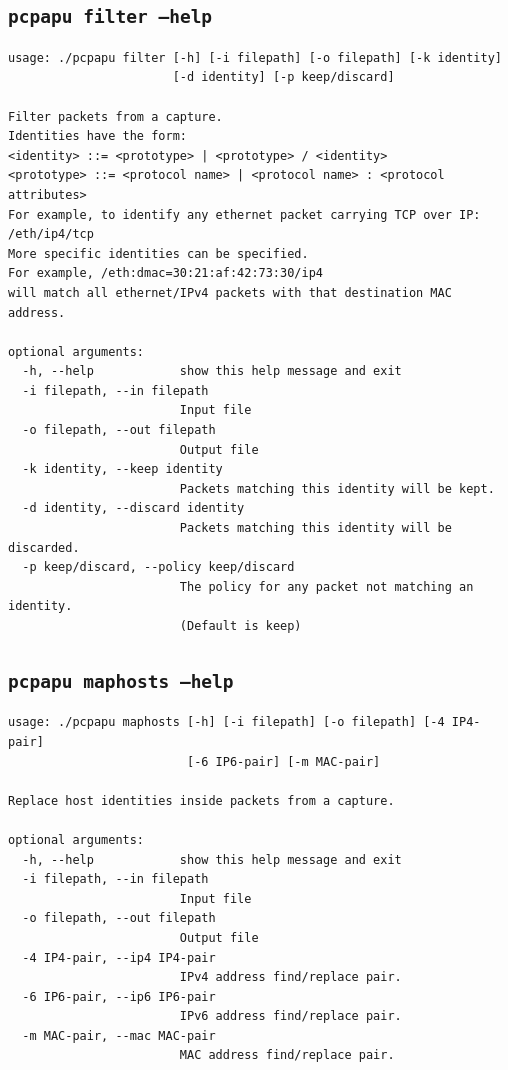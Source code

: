 \documentclass[10pt,a4paper,notitlepage]{report}
\begin{document}
\subsection{\texttt{pcpapu filter --help}}
\begin{verbatim}
usage: ./pcpapu filter [-h] [-i filepath] [-o filepath] [-k identity]
                       [-d identity] [-p keep/discard]

Filter packets from a capture.
Identities have the form:
<identity> ::= <prototype> | <prototype> / <identity>
<prototype> ::= <protocol name> | <protocol name> : <protocol attributes>
For example, to identify any ethernet packet carrying TCP over IP: /eth/ip4/tcp
More specific identities can be specified.
For example, /eth:dmac=30:21:af:42:73:30/ip4
will match all ethernet/IPv4 packets with that destination MAC address.

optional arguments:
  -h, --help            show this help message and exit
  -i filepath, --in filepath
                        Input file
  -o filepath, --out filepath
                        Output file
  -k identity, --keep identity
                        Packets matching this identity will be kept.
  -d identity, --discard identity
                        Packets matching this identity will be discarded.
  -p keep/discard, --policy keep/discard
                        The policy for any packet not matching an identity.
                        (Default is keep)
\end{verbatim}

\subsection{\texttt{pcpapu maphosts --help}}
\begin{verbatim}
usage: ./pcpapu maphosts [-h] [-i filepath] [-o filepath] [-4 IP4-pair]
                         [-6 IP6-pair] [-m MAC-pair]

Replace host identities inside packets from a capture.

optional arguments:
  -h, --help            show this help message and exit
  -i filepath, --in filepath
                        Input file
  -o filepath, --out filepath
                        Output file
  -4 IP4-pair, --ip4 IP4-pair
                        IPv4 address find/replace pair.
  -6 IP6-pair, --ip6 IP6-pair
                        IPv6 address find/replace pair.
  -m MAC-pair, --mac MAC-pair
                        MAC address find/replace pair.
\end{verbatim}
\end{document}

